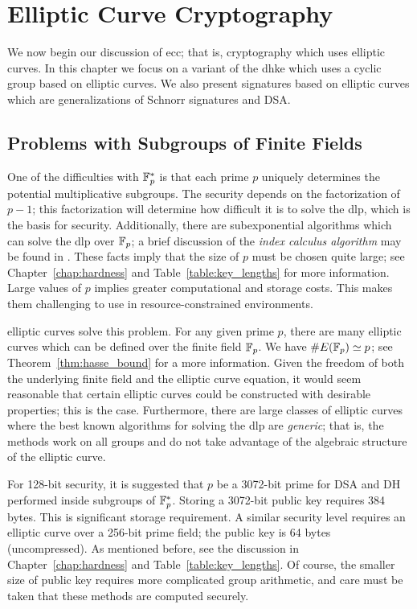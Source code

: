 \chapter{Elliptic Curve Cryptography}
\label{chap:elliptic}

We now begin our discussion of \gls{ecc};
that is, cryptography which uses \glspl{elliptic curve}.
In this chapter we focus on a variant of the \gls{dhke}
which uses a \gls{cyclic group} based on \glspl{elliptic curve}.
We also present \glspl{signature} based on \glspl{elliptic curve}
which are generalizations of Schnorr signatures and DSA.



\section{Problems with Subgroups of Finite Fields}
\label{sec:Fp_problems}

One of the difficulties with $\mathbb{F}_{p}^{*}$
is that each prime $p$ uniquely determines the potential
multiplicative \glspl{subgroup}.
The security depends on the factorization of $p-1$;
this factorization will determine how difficult it is to solve
the \gls{dlp}, which is the basis for security.
Additionally, there are subexponential algorithms which can solve
the \gls{dlp} over $\mathbb{F}_{p}$;
a brief discussion of the \emph{index calculus algorithm}
may be found in \cite[Chapter~10.3]{IntroModernCrypto}.
These facts imply that the size of $p$ must be chosen quite large;
see Chapter~\ref{chap:hardness} and Table~\ref{table:key_lengths}
for more information.
Large values of $p$ implies greater computational and storage costs.
This makes them challenging to use in resource-constrained environments.

\Glspl{elliptic curve} solve this problem.
For any given prime $p$, there are many \glspl{elliptic curve}
which can be defined over the \gls{finite field} $\mathbb{F}_{p}$.
We have $\#E(\mathbb{F}_{p})\simeq p$;
see Theorem~\ref{thm:hasse_bound} for a more information.
Given the freedom of both the underlying \gls{finite field}
and the \gls{elliptic curve} equation,
it would seem reasonable that certain \glspl{elliptic curve} could be
constructed with desirable properties;
this is the case.
Furthermore, there are large classes of \glspl{elliptic curve}
where the best known algorithms for solving the \gls{dlp} are \emph{generic};
that is, the methods work on all \glspl{group} and do not take advantage
of the algebraic structure of the \gls{elliptic curve}.

For 128-bit security, it is suggested that $p$ be a 3072-bit prime
for DSA and DH performed inside \glspl{subgroup} of $\mathbb{F}_{p}^{*}$.
Storing a 3072-bit public key requires 384 bytes.
This is significant storage requirement.
A similar security level requires
an \gls{elliptic curve} over a 256-bit prime \gls{field};
the public key is 64 bytes (uncompressed).
As mentioned before, see the discussion in Chapter~\ref{chap:hardness}
and Table~\ref{table:key_lengths}.
Of course, the smaller size of public key requires more complicated
group arithmetic, and care must be taken that these
methods are computed securely.



